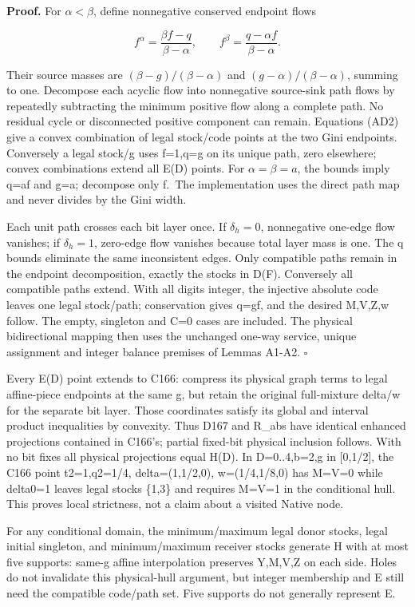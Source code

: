 \documentclass[
  american,
  11pt,
]{article}
\begin{document}
\textbf{Proof.} For \(\alpha<\beta\), define nonnegative conserved
endpoint flows

\[
f^\alpha=\frac{\beta f-q}{\beta-\alpha},\qquad
f^\beta=\frac{q-\alpha f}{\beta-\alpha}.
\]

Their source masses are \((\beta-g)/(\beta-\alpha)\) and
\((g-\alpha)/(\beta-\alpha)\), summing to one. Decompose each acyclic
flow into nonnegative source-sink path flows by repeatedly subtracting
the minimum positive flow along a complete path. No residual cycle or
disconnected positive component can remain. Equations (AD2) give a
convex combination of legal stock/code points at the two Gini endpoints.
Conversely a legal stock/g uses f=1,q=g on its unique path, zero
elsewhere; convex combinations extend all E(D) points. For
\(\alpha=\beta=a\), the bounds imply q=af and g=a; decompose only f.~The
implementation uses the direct path map and never divides by the Gini
width.

Each unit path crosses each bit layer once. If \(\delta_h=0\),
nonnegative one-edge flow vanishes; if \(\delta_h=1\), zero-edge flow
vanishes because total layer mass is one. The q bounds eliminate the
same inconsistent edges. Only compatible paths remain in the endpoint
decomposition, exactly the stocks in D(F). Conversely all compatible
paths extend. With all digits integer, the injective absolute code
leaves one legal stock/path; conservation gives q=gf, and the desired
M,V,Z,w follow. The empty, singleton and C=0 cases are included. The
physical bidirectional mapping then uses the unchanged one-way service,
unique assignment and integer balance premises of Lemmas A1-A2.
\(\square\)

Every E(D) point extends to C166: compress its physical graph terms to
legal affine-piece endpoints at the same g, but retain the original
full-mixture delta/w for the separate bit layer. Those coordinates
satisfy its global and interval product inequalities by convexity. Thus
D167 and R\_\allowbreak{}abs have identical enhanced projections contained in C166's;
partial fixed-bit physical inclusion follows. With no bit fixes all
physical projections equal H(D). In D=0..4,b=2,g in {[}0,1/2{]}, the
C166 point t2=1,q2=1/4, delta=(1,1/2,0), w=(1/4,1/8,0) has M=V=0 while
delta0=1 leaves legal stocks \{1,3\} and requires M=V=1 in the
conditional hull. This proves local strictness, not a claim about a
visited Native node.

For any conditional domain, the minimum/maximum legal donor stocks,
legal initial singleton, and minimum/maximum receiver stocks generate H
with at most five supports: same-g affine interpolation preserves
Y,M,V,Z on each side. Holes do not invalidate this physical-hull
argument, but integer membership and E still need the compatible
code/path set. Five supports do not generally represent E.
\end{document}

